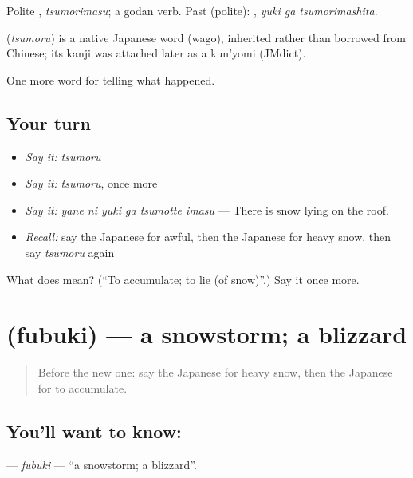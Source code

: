 Polite \textbf{}, \emph{tsumorimasu}; a godan verb. Past (polite): \textbf{ }, \emph{yuki ga tsumorimashita}.

\begin{cousinweb}
\textbf{} (\emph{tsumoru}) is a native Japanese word (wago), inherited rather than borrowed from Chinese; its kanji was attached later as a kun'yomi (JMdict).
\end{cousinweb}

\begin{grammarlens}[title={What you've built}]
One more word for telling what happened.
\end{grammarlens}

\subsection*{Your turn}
\begin{itemize}
\raggedright
  \item \emph{Say it:} \emph{tsumoru}
  \item \emph{Say it:} \emph{tsumoru}, once more
  \item \emph{Say it:} \emph{yane ni yuki ga tsumotte imasu} — There is snow lying on the roof.
  \item \emph{Recall:} say the Japanese for awful, then the Japanese for heavy snow, then say \emph{tsumoru} again
\end{itemize}

\begin{tcolorbox}[breakable,colback=teal!4,colframe=teal!35!black,title={Before you move on}]
What does  mean? (\textquotedblleft{}To accumulate; to lie (of snow)\textquotedblright{}.) Say it once more.
\end{tcolorbox}
\section[\texorpdfstring{\ja{ふぶき} (fubuki)}{ふぶき (fubuki)}]{ (fubuki) — a snowstorm; a blizzard}

\label{lesson:JA-C277-fubuki}



\begin{quote}
Before the new one: say the Japanese for heavy snow, then the Japanese for to accumulate.
\end{quote}

\subsection*{You'll want to know: }
\textbf{} — \emph{fubuki} — \textquotedblleft{}a snowstorm; a blizzard\textquotedblright{}.

